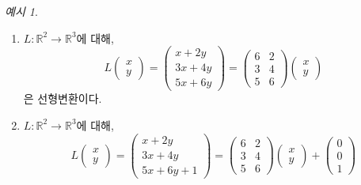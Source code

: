 \documentclass[unfonts,oneside,a4paper]{oblivoir}
\theoremstyle{definition}
\theoremstyle{theorem}
\theoremstyle{theorem}
\theoremstyle{remark}
\theoremstyle{remark}
\theoremstyle{remark}
\newtheorem*{example}{예시}
\theoremstyle{remark}
\begin{document}
\begin{example}
    \leavevmode
    \begin{enumerate}
        \item $L: \mathbb R^2 \rightarrow \mathbb R^3$에 대해,
            \begin{equation*}
                L \begin{pmatrix}
                    x \\ y
                    \end{pmatrix} = \begin{pmatrix}
                    x + 2y \\ 3x + 4y \\ 5x + 6y
                    \end{pmatrix} = \begin{pmatrix}
                    6 & 2 \\ 3 & 4 \\ 5 & 6
                    \end{pmatrix} \begin{pmatrix}
                    x \\ y
                \end{pmatrix}
            \end{equation*}
            은 선형변환이다.
        \item $L: \mathbb R^2 \rightarrow \mathbb R^3$에 대해,
            \begin{equation*}
                L \begin{pmatrix}
                    x \\ y
                    \end{pmatrix} = \begin{pmatrix}
                    x + 2y \\ 3x + 4y \\ 5x + 6y + 1
                    \end{pmatrix} = \begin{pmatrix}
                    6 & 2 \\ 3 & 4 \\ 5 & 6
                    \end{pmatrix} \begin{pmatrix}
                    x \\ y
                    \end{pmatrix} + \begin{pmatrix}
                    0 \\ 0 \\ 1

\end{pmatrix}
\end{equation*}
\end{enumerate}
\end{example}
\end{document}
